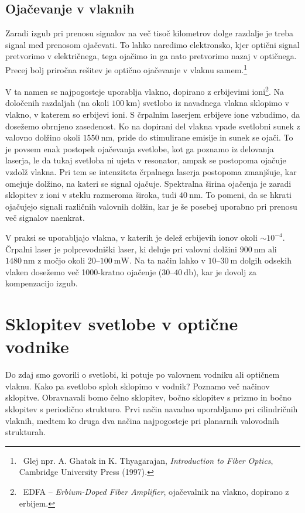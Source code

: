 \subsection*{Ojačevanje v vlaknih}
Zaradi izgub pri prenosu signalov na več tisoč kilometrov dolge razdalje 
je treba signal med prenosom ojačevati. To lahko naredimo elektronsko, kjer optični signal 
pretvorimo v električnega, tega ojačimo in ga nato pretvorimo nazaj v optičnega. 
Precej bolj priročna rešitev je optično ojačevanje v vlaknu 
samem.\footnote{~Glej npr. A. Ghatak in K. Thyagarajan, {\it Introduction to Fiber Optics}, 
Cambridge University Press (1997).} 

V ta namen se najpogosteje uporablja vlakno, dopirano z erbijevimi 
ioni\footnote{~EDFA -- {\it Erbium-Doped Fiber Amplifier}, 
ojačevalnik na vlakno, dopirano z erbijem.}. 
Na določenih razdaljah (na okoli $100~\si{\kilo\meter}$) svetlobo iz navadnega vlakna 
sklopimo v vlakno, v katerem so erbijevi ioni.
S črpalnim laserjem erbijeve ione vzbudimo, da dosežemo obrnjeno zasedenost. 
Ko na dopirani del vlakna vpade svetlobni sunek z valovno dolžino okoli 
$1550~\si{\nano\meter}$, pride do stimulirane emisije in 
sunek se ojači. To je povsem enak postopek ojačevanja svetlobe, kot ga poznamo iz 
delovanja laserja, le da tukaj svetloba ni ujeta v resonator, ampak se postopoma 
ojačuje vzdolž vlakna. Pri tem se intenziteta črpalnega laserja postopoma zmanjšuje,
kar omejuje dolžino, na kateri se signal ojačuje.
Spektralna širina ojačenja je zaradi sklopitev z ioni v steklu 
razmeroma široka, tudi $40~\si{\nano\meter}$. To pomeni, da se hkrati ojačujejo signali različnih 
valovnih dolžin, kar je še posebej uporabno pri prenosu več signalov naenkrat.

V praksi se uporabljajo vlakna, v katerih je delež erbijevih ionov okoli $\sim 10^{-4}$. 
Črpalni laser je polprevodniški laser, ki 
deluje pri valovni dolžini $900~\si{\nano\meter}$ ali $1480~\si{\nano\meter}$ 
z močjo okoli $20$--$100~\si{\milli\watt}$. Na ta način lahko v $10$--$30~\si{\meter}$
dolgih odsekih vlaken dosežemo več 1000-kratno ojačenje ($30$--$40~\si{\decibel}$), kar 
je dovolj za kompenzacijo izgub.

\section{Sklopitev svetlobe v optične vodnike}
Do zdaj smo govorili o svetlobi, ki potuje po valovnem vodniku ali optičnem vlaknu. Kako pa 
svetlobo sploh sklopimo v vodnik? Poznamo več načinov sklopitve. Obravnavali bomo 
čelno sklopitev, bočno sklopitev s prizmo in bočno sklopitev s periodično strukturo.
Prvi način navadno uporabljamo pri 
cilindričnih vlaknih, medtem ko druga dva načina najpogosteje pri planarnih valovodnih strukturah.

